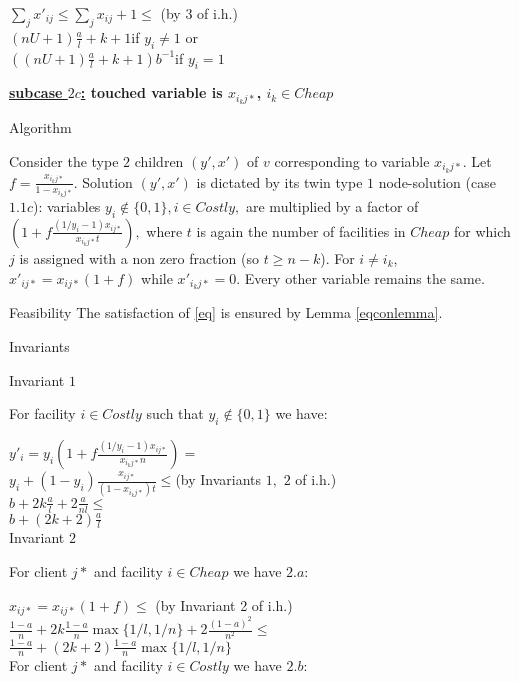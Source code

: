 \documentclass[11pt]{article}\usepackage{amsmath}
\begin{document}
\noindent
$\sum_j x'_{ij}\leq \sum_j x_{ij} + 1\leq$ \hfill (by $3$ of i.h.)\\
$(nU+1)\frac{a}{l}+k+1$\hfill  if $y_i \neq 1$  or \\
$((nU+1)\frac{a}{l}+k+1)b^{-1}$\hfill if $y_i =1$\\ 






\medskip 

\noindent
{\bf \underline{subcase $2c$:} touched variable is  $x_{i_kj*}$, $i_k \in Cheap$}

{\sc Algorithm}

Consider the type $2$ children $(y',x')$ of $v$ corresponding to variable $x_{i_kj*}$.
Let $f=\frac{x_{i_kj*}}{1-x_{i_kj*}}$. Solution $(y',x')$ is dictated by its twin type $1$ node-solution (case $1.1c$):
variables $y_{i}\notin \{0,1\}, i \in Costly,$ are multiplied by a
factor of $(1+f\frac{(1/y_{i}-1)x_{ij*}}{x_{i_kj*}t}),$ where 
 $t$ is again the number of
facilities in $Cheap$ for which $j$ is assigned with a non zero fraction (so $t \geq n-k$).
 For $i\neq i_k$, $x'_{ij*}=x_{ij*}(1+f)$ while $x'_{i_kj*}=0$. Every other variable remains the same.


{\sc Feasibility}
The satisfaction of \eqref{eq} is ensured by Lemma \ref{eqconlemma}.

{\sc Invariants}

{\sf Invariant $1$}

For  facility $i \in Costly$ such that $y_i \notin \{0,1\}$ we have:

 \noindent
$y'_{i}=y_{i}(1+f\frac{(1/y_{i}-1)x_{ij*}}{x_{i_kj*}n})=$\\
$y_{i}+(1-y_{i})\frac{x_{ij*}}{(1-x_{i_kj*})t}\leq$\hfill (by Invariants $1,$ $2$ of i.h.) \\
$b+2k\frac{a}{l}+2\frac{a}{nl}\leq$\\
$b+(2k+2)\frac{a}{l}$\\

{\sf Invariant $2$}

For client $j*$ and facility $i\in Cheap$ we have $2.a$:

\noindent
$x_{ij*}=x_{ij*}(1+f)\leq$ \hfill (by Invariant 2 of i.h.)\\
$\frac{1-a}{n}+2k\frac{1-a}{n}\max\{1/l,1/n\}+2\frac{(1-a)^2}{n^2}\leq$\\
$\frac{1-a}{n}+(2k+2)\frac{1-a}{n}\max\{1/l,1/n\}$\\

For client $j*$ and facility $i\in Costly$ we have $2.b$:
\end{document}
